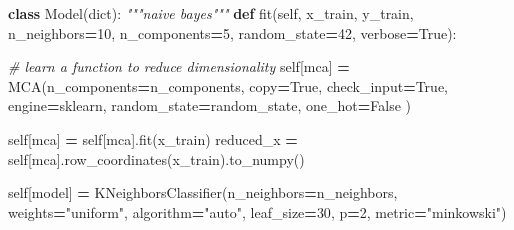 \documentclass[
]{article}
\newenvironment{Shaded}{\begin{snugshade}}{\end{snugshade}}
\newcommand{\BuiltInTok}[1]{#1}
\newcommand{\CommentTok}[1]{\textcolor[rgb]{0.56,0.35,0.01}{\textit{#1}}}
\newcommand{\DecValTok}[1]{\textcolor[rgb]{0.00,0.00,0.81}{#1}}
\newcommand{\KeywordTok}[1]{\textcolor[rgb]{0.13,0.29,0.53}{\textbf{#1}}}
\newcommand{\NormalTok}[1]{#1}
\newcommand{\OperatorTok}[1]{\textcolor[rgb]{0.81,0.36,0.00}{\textbf{#1}}}
\newcommand{\StringTok}[1]{\textcolor[rgb]{0.31,0.60,0.02}{#1}}
\newcommand{\VariableTok}[1]{\textcolor[rgb]{0.00,0.00,0.00}{#1}}
\begin{document}
\begin{Shaded}
\begin{Highlighting}[]


\KeywordTok{class}\NormalTok{ Model(}\BuiltInTok{dict}\NormalTok{):}
    \CommentTok{"""naive bayes"""}
    \KeywordTok{def}\NormalTok{ fit(}\VariableTok{self}\NormalTok{, x\_train, y\_train, n\_neighbors}\OperatorTok{=}\DecValTok{10}\NormalTok{, }
\NormalTok{            n\_components}\OperatorTok{=}\DecValTok{5}\NormalTok{, random\_state}\OperatorTok{=}\DecValTok{42}\NormalTok{, verbose}\OperatorTok{=}\VariableTok{True}\NormalTok{):}

        \CommentTok{\# learn a function to reduce dimensionality}
        \VariableTok{self}\NormalTok{[}\StringTok{\textquotesingle{}mca\textquotesingle{}}\NormalTok{] }\OperatorTok{=}\NormalTok{ MCA(n\_components}\OperatorTok{=}\NormalTok{n\_components,}
\NormalTok{                          copy}\OperatorTok{=}\VariableTok{True}\NormalTok{,}
\NormalTok{                          check\_input}\OperatorTok{=}\VariableTok{True}\NormalTok{,}
\NormalTok{                          engine}\OperatorTok{=}\StringTok{\textquotesingle{}sklearn\textquotesingle{}}\NormalTok{,}
\NormalTok{                          random\_state}\OperatorTok{=}\NormalTok{random\_state,}
\NormalTok{                          one\_hot}\OperatorTok{=}\VariableTok{False}
\NormalTok{                          )}

        \VariableTok{self}\NormalTok{[}\StringTok{\textquotesingle{}mca\textquotesingle{}}\NormalTok{] }\OperatorTok{=} \VariableTok{self}\NormalTok{[}\StringTok{\textquotesingle{}mca\textquotesingle{}}\NormalTok{].fit(x\_train)}
\NormalTok{        reduced\_x }\OperatorTok{=} \VariableTok{self}\NormalTok{[}\StringTok{\textquotesingle{}mca\textquotesingle{}}\NormalTok{].row\_coordinates(x\_train).to\_numpy()}

        \VariableTok{self}\NormalTok{[}\StringTok{\textquotesingle{}model\textquotesingle{}}\NormalTok{] }\OperatorTok{=}\NormalTok{ KNeighborsClassifier(n\_neighbors}\OperatorTok{=}\NormalTok{n\_neighbors,}
\NormalTok{                                             weights}\OperatorTok{=}\StringTok{"uniform"}\NormalTok{,}
\NormalTok{                                             algorithm}\OperatorTok{=}\StringTok{"auto"}\NormalTok{,}
\NormalTok{                                             leaf\_size}\OperatorTok{=}\DecValTok{30}\NormalTok{,}
\NormalTok{                                             p}\OperatorTok{=}\DecValTok{2}\NormalTok{,}
\NormalTok{                                             metric}\OperatorTok{=}\StringTok{"minkowski"}\NormalTok{)}


\end{Highlighting}
\end{Shaded}
\end{document}
